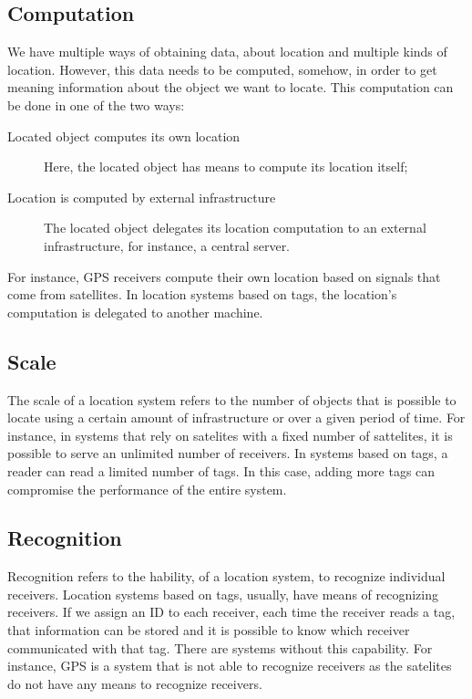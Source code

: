 \subsection{Computation}
\label{sub:background_computation}
We have multiple ways of obtaining data, about location and multiple kinds of location.
However, this data needs to be computed, somehow, in order to get meaning information about the object we want to locate.
This computation can be done in one of the two ways:
\begin{description}
  \item[Located object computes its own location] Here, the located object has means to compute its location itself;
  \item[Location is computed by external infrastructure] The located object delegates its location computation to an external infrastructure, for instance, a central server.
\end{description}

For instance, \gls{GPS} receivers compute their own location based on signals that come from satellites.
In location systems based on tags, the location's computation is delegated to another machine.

\subsection{Scale}
\label{sub:background_scale}
The scale of a location system refers to the number of objects that is possible to locate using a certain amount of infrastructure or over a given period of time.
For instance, in systems that rely on satelites with a fixed number of sattelites, it is possible to serve an unlimited number of receivers.
In systems based on tags, a reader can read a limited number of tags.
In this case, adding more tags can compromise the performance of the entire system.

\subsection{Recognition}
\label{sub:background_recognition}
Recognition refers to the hability, of a location system, to recognize individual receivers.
Location systems based on tags, usually, have means of recognizing receivers.
If we assign an \gls{ID} to each receiver, each time the receiver reads a tag, that information can be stored and it is possible to know which receiver communicated with that tag.
There are systems without this capability.
For instance, \gls{GPS} is a system that is not able to recognize receivers as the satelites do not have any means to recognize receivers.

